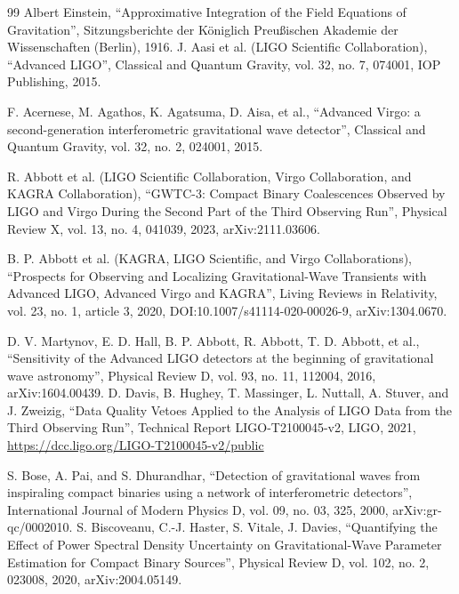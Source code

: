 \documentclass[12pt]{article}
\begin{document}
\begin{thebibliography}{99}
  Albert Einstein,
  ``Approximative Integration of the Field Equations of Gravitation'',
  Sitzungsberichte der Königlich Preußischen Akademie der Wissenschaften (Berlin), 1916.
  J. Aasi et al. (LIGO Scientific Collaboration),
  ``Advanced LIGO'',
  Classical and Quantum Gravity, vol. 32, no. 7, 074001, IOP Publishing, 2015.

  F. Acernese, M. Agathos, K. Agatsuma, D. Aisa, et al.,
  ``Advanced Virgo: a second-generation interferometric gravitational wave detector'',
  Classical and Quantum Gravity, vol. 32, no. 2, 024001, 2015.


  R. Abbott et al. (LIGO Scientific Collaboration, Virgo Collaboration, and KAGRA Collaboration),
  ``GWTC-3: Compact Binary Coalescences Observed by LIGO and Virgo During the Second Part of the Third Observing Run'',
  Physical Review X, vol. 13, no. 4, 041039, 2023,
  arXiv:2111.03606.

  B. P. Abbott et al. (KAGRA, LIGO Scientific, and Virgo Collaborations),
  ``Prospects for Observing and Localizing Gravitational-Wave Transients with
  Advanced LIGO, Advanced Virgo and KAGRA'',
  Living Reviews in Relativity, vol. 23, no. 1, article 3, 2020,
  DOI:10.1007/s41114-020-00026-9, arXiv:1304.0670.

  D. V. Martynov, E. D. Hall, B. P. Abbott, R. Abbott, T. D. Abbott, et al.,
  ``Sensitivity of the Advanced LIGO detectors at the beginning of gravitational wave astronomy'',
  Physical Review D, vol. 93, no. 11, 112004, 2016,
  arXiv:1604.00439.
  D. Davis, B. Hughey, T. Massinger, L. Nuttall, A. Stuver, and J. Zweizig,
  ``Data Quality Vetoes Applied to the Analysis of LIGO Data from the Third Observing Run'',
  Technical Report LIGO-T2100045-v2, LIGO, 2021,
  \url{https://dcc.ligo.org/LIGO-T2100045-v2/public}

  S. Bose, A. Pai, and S. Dhurandhar,
  ``Detection of gravitational waves from inspiraling compact binaries using a network of interferometric detectors'',
  International Journal of Modern Physics D, vol. 09, no. 03, 325, 2000,
  arXiv:gr-qc/0002010.
  S. Biscoveanu, C.-J. Haster, S. Vitale, J. Davies,
  ``Quantifying the Effect of Power Spectral Density Uncertainty on Gravitational-Wave Parameter Estimation for Compact Binary Sources'',
  Physical Review D, vol. 102, no. 2, 023008, 2020,
  arXiv:2004.05149.


\end{thebibliography}
\end{document}
